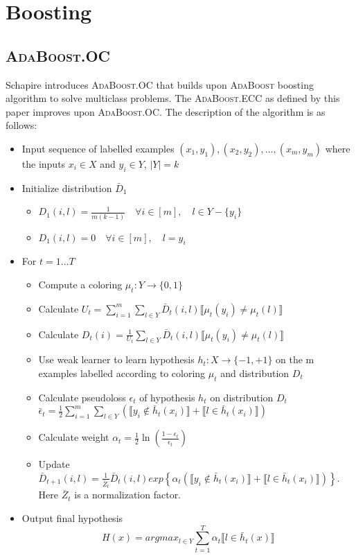 \documentclass[11pt]{article}
\begin{document}
\section{Boosting}
\subsection{\textsc{AdaBoost}.OC}
Schapire\cite{s-ocbmlp-97} introduces \textsc{AdaBoost}.OC that builds upon \textsc{AdaBoost} boosting algorithm to solve multiclass problems. The \textsc{AdaBoost}.ECC as defined by this paper improves upon \textsc{AdaBoost}.OC. The description of the algorithm is as follows:
\begin{itemize}
\item Input sequence of labelled examples $(x_1, y_1), (x_2, y_2), \ldots, (x_m, y_m)$ where the inputs $x_i \in X$ and $y_i \in Y$, $|Y| = k$
\item Initialize distribution $\bar D_1$
\begin{itemize}
\item $D_1(i, l) = \frac{1}{m(k-1)}\quad \forall i \in [m],\quad l \in Y - \{y_i\}$
\item $D_1(i, l) = 0 \quad \forall i \in [m],\quad l = y_i$
\end{itemize}
\item For $t =  1 \ldots T$
\begin{itemize}
\item Compute a coloring $\mu_t : Y \rightarrow \{0,1\}$
\item Calculate $U_t = \sum_{i=1}^m \sum_{l \in Y} \bar D_t(i,l) \llbracket \mu_t(y_i) \neq \mu_t(l)\rrbracket$
\item Calculate $D_t(i) = \frac{1}{U_t} \sum_{l \in Y} \bar D_t(i,l) \llbracket \mu_t(y_i) \neq \mu_t(l)\rrbracket$
\item Use weak learner to learn hypothesis $h_t : X \rightarrow \{-1,+1\}$ on the m examples labelled according to coloring $\mu_t$ and distribution $D_t$
\item Calculate pseudoloss $\epsilon_t$ of hypothesis $h_t$ on distribution $D_t$\\
$\bar \epsilon_t = \frac{1}{2} \sum_{i=1}^m \sum_{l \in Y} (\llbracket y_i \notin \bar h_t(x_i)\rrbracket + \llbracket l \in \bar h_t(x_i) \rrbracket)$
\item Calculate weight $\alpha_t = \frac{1}{2} \ln \left( \frac{1-\epsilon_t}{\epsilon_t}\right)$
\item Update $\bar D_{t+1}(i,l) = \frac{1}{\bar Z_t} \bar D_t(i,l) exp \left\{ \alpha_t(\llbracket y_i \notin \bar h_t(x_i)\rrbracket + \llbracket l \in \bar h_t(x_i) \rrbracket)\right\}$. Here $\bar Z_t$ is a normalization factor.
\end{itemize}
\item Output final hypothesis $$H(x) = argmax_{l \in Y} \sum_{t=1}^T \alpha_t \llbracket l \in \bar h_t(x) \rrbracket$$
\end{itemize}
\end{document}
